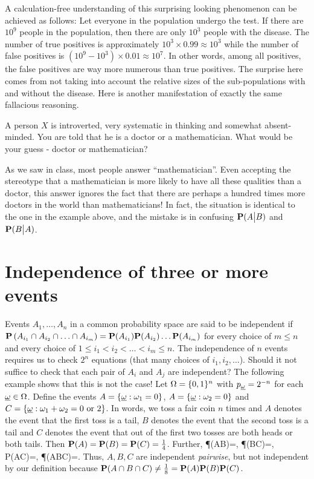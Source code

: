 \documentclass[preprint,  11pt]{amsart}
\def\omeg{\underline{\ome}}
\begin{document}
A calculation-free understanding of this surprising looking phenomenon can be achieved as follows: Let everyone in the population undergo the test. If there are $10^{9}$ people in the population, then there are only $10^{3}$ people with the disease. The number of true positives is approximately $10^{3}\times 0.99\approx 10^{3}$ while the number of false positives is $(10^{9}-10^{3})\times 0.01\approx 10^{7}$. In other words, among all positives, the false positives are way more numerous than true positives.
\eeg
The surprise here comes from not taking into account the relative sizes of the sub-populations with and without the disease. Here is another manifestation of exactly the same fallacious reasoning.

 A person $X$ is introverted,  very systematic in thinking and somewhat absent-minded. You are told that he is a doctor or a mathematician. What would be your guess - doctor or mathematician?

As we saw in class, most people answer ``mathematician''. Even accepting the stereotype that a mathematician is more likely to have all these qualities than a doctor, this answer ignores the fact that there are perhaps a hundred times more doctors in the world than mathematicians! In fact, the situation is identical to the one in the example above, and the mistake is in confusing $\P(A\big| B)$ and $\P(B\big| A)$.


\section{Independence of three or more events}
\bdefn Events $A_{1},\ldots ,A_{n}$ in a common probability space are said to be independent if
$
\P\l(A_{i_{1}}\cap A_{i_{2}}\cap \ldots \cap A_{i_{m}}\r)=\P(A_{i_{1}})\P(A_{i_{2}})\ldots \P(A_{i_{m}})$ for every choice of $m\le n$ and every choice of $1\le i_{1}<i_{2}<\ldots <i_{m}\le n$.
\edefn
 The independence of $n$ events requires us to check $2^{n}$ equations (that many choices of $i_{1},i_{2},\ldots$). Should it not suffice to check that each pair of $A_{i}$ and $A_{j}$ are independent? The following example shows that this is not the case!
\beg Let $\Ome=\{0,1\}^{n}$ with $p_{\omeg}=2^{-n}$ for each $\omeg\in \Ome$. Define the events $A=\{\omeg\suchthat \ome_{1}=0\}$, $A=\{\omeg\suchthat \ome_{2}=0\}$ and $C=\{\omeg\suchthat \ome_{1}+\ome_{2}=0 \mb{ or }2\}$. In words, we toss a fair coin $n$ times and $A$ denotes the event that the first toss is a tail, $B$ denotes the event that the second toss is a tail and $C$ denotes the event that out of the first two tosses are both heads or both tails. Then $\P(A)=\P(B)=\P(C)=\frac{1}{4}$. Further,
\ba
\P(A\cap B)=, \; \P(B\cap C)=, \; P(A\cap C)=, \; \P(A\cap B\cap C)=.
\ea
Thus,  $A,B,C$ are independent {\em pairwise}, but not independent by our definition because $\P(A\cap B\cap C)\not= \frac{1}{8}=\P(A)\P(B)\P(C)$.
\end{document}
